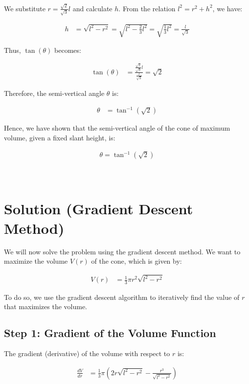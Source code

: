 \documentclass[journal]{IEEEtran}
\begin{document}
We substitute \( r = \frac{\sqrt{2}}{\sqrt{3}} l \) and calculate \( h \). From the relation \( l^2 = r^2 + h^2 \), we have:

\begin{align}
h &= \sqrt{l^2 - r^2} = \sqrt{l^2 - \frac{2}{3} l^2} = \sqrt{\frac{1}{3} l^2} = \frac{l}{\sqrt{3}}
\end{align}

Thus, \( \tan(\theta) \) becomes:

\begin{align}
\tan(\theta) &= \frac{\frac{\sqrt{2}}{\sqrt{3}} l}{\frac{l}{\sqrt{3}}} = \sqrt{2}
\end{align}

Therefore, the semi-vertical angle \( \theta \) is:

\begin{align}
\theta &= \tan^{-1}(\sqrt{2})
\end{align}

Hence, we have shown that the semi-vertical angle of the cone of maximum volume, given a fixed slant height, is:

\begin{align}
\boxed{\theta = \tan^{-1}(\sqrt{2})}
\end{align}
\\ \\

\section*{Solution (Gradient Descent Method)}

We will now solve the problem using the gradient descent method. We want to maximize the volume \( V(r) \) of the cone, which is given by:

\begin{align}
V(r) &= \frac{1}{3} \pi r^2 \sqrt{l^2 - r^2}
\end{align}

To do so, we use the gradient descent algorithm to iteratively find the value of \( r \) that maximizes the volume.

\subsection*{Step 1: Gradient of the Volume Function}

The gradient (derivative) of the volume with respect to \( r \) is:

\begin{align}
\frac{dV}{dr} &= \frac{1}{3} \pi \left( 2r \sqrt{l^2 - r^2} - \frac{r^3}{\sqrt{l^2 - r^2}} \right)
\end{align}
\end{document}

